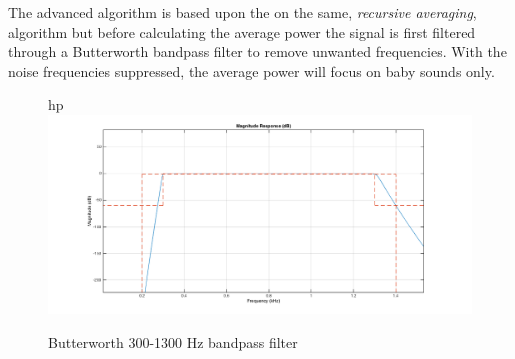 The advanced algorithm is based upon the on the same, \emph{recursive averaging}, algorithm but before calculating
the average power the signal is first filtered through a Butterworth bandpass filter to remove unwanted 
frequencies. With the noise frequencies suppressed, the average power will focus on baby sounds only. 

\begin{figure}{hp}
  \centering
  \includegraphics[width=1\textwidth]{sections/butt_pass_scale.png}
  \caption{Butterworth 300-1300 Hz bandpass filter}
  \label{fig:butt_pass}
\end{figure}

